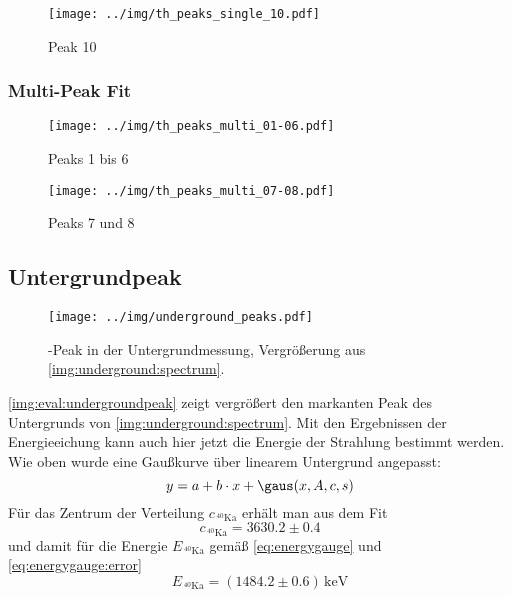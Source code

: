 \begin{figure}[H]
\begin{center}
  \texttt{[image: ../img/th\_peaks\_single\_10.pdf]}
  \caption{Peak 10}
  \label{img:th:peaks:single:10}
\end{center}
\end{figure}

\subsubsection{Multi-Peak Fit} %
\begin{figure}[H]
\begin{center}
  \texttt{[image: ../img/th\_peaks\_multi\_01-06.pdf]}
  \caption{Peaks 1 bis 6}
  \label{img:th:peaks:multi:0106}
\end{center}
\end{figure}

\begin{figure}[H]
\begin{center}
  \texttt{[image: ../img/th\_peaks\_multi\_07-08.pdf]}
  \caption{Peaks 7 und 8}
  \label{img:th:peaks:multi:0708}
\end{center}
\end{figure}

\subsection{Untergrundpeak}
\label{sub:eval:undergroundpeak}

\begin{figure}[H]
\begin{center}
  \texttt{[image: ../img/underground\_peaks.pdf]}
  \caption{-Peak in der Untergrundmessung, Vergrößerung aus \autoref{img:underground:spectrum}.}
  \label{img:eval:undergroundpeak}
\end{center}
\end{figure}

\autoref{img:eval:undergroundpeak} zeigt vergrößert
den markanten Peak des Untergrunds von \autoref{img:underground:spectrum}.
Mit den Ergebnissen der Energieeichung kann auch hier jetzt die Energie der Strahlung bestimmt werden.
Wie oben wurde eine Gaußkurve über linearem Untergrund angepasst:
\begin{equation}
  y = a + b \cdot x + \gaus(x, A, c, s)
\end{equation}
Für das Zentrum der Verteilung $c_{\,{}^{40}\text{Ka}}$ erhält man aus dem Fit
\begin{equation}
  c_{\,{}^{40}\text{Ka}} = 3630.2 \pm 0.4	
\end{equation}
und damit für die Energie $E_{\,{}^{40}\text{Ka}}$ gemäß \autoref{eq:energygauge} und \autoref{eq:energygauge:error}
\begin{equation}
  E_{\,{}^{40}\text{Ka}} = (1484.2 \pm 0.6)\,\text{keV}
\end{equation}
